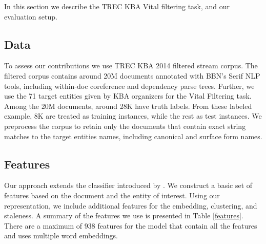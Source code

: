\documentclass{article}
\begin{document}
In this section we describe the TREC KBA Vital filtering task, and our evaluation setup.

\subsection{Data}
\label{data}

To assess our contributions we use TREC KBA 2014 filtered stream corpus. The filtered corpus contains around 20M documents annotated with BBN's Serif NLP tools, including within-doc coreference and dependency parse trees. Further, we use the 71 target entities given by KBA organizers for the Vital Filtering task. Among the 20M documents, around 28K have truth labels. From these labeled example, 8K are treated as training instances, while the rest as test instances.
We preprocess the corpus to retain only the documents that contain exact string matches to the target entities names, including canonical and surface form names.

\subsection{Features}
\label{feat}

Our approach extends the classifier introduced by \citet{jingang13}.
We construct a basic set of features based on the document and the entity of interest.
Using our representation, we include additional features for the embedding, clustering, and staleness.
A summary of the features we use is presented in Table \ref{features}. 
There are a maximum of $938$ features for the model that contain all the features and uses multiple word embeddings.

\end{document}
